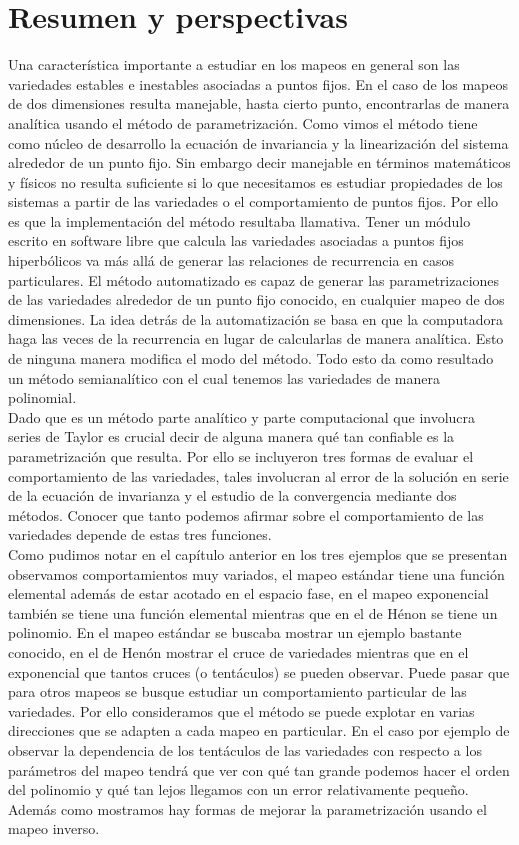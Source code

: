 
\chapter{Resumen y perspectivas}
Una característica importante a estudiar en los mapeos en general son las variedades estables e inestables asociadas a puntos fijos. En el caso de los mapeos de dos dimensiones resulta manejable, hasta cierto punto, encontrarlas de manera analítica usando el método de parametrización. Como vimos el método tiene como núcleo de desarrollo la ecuación de invariancia y la linearización del sistema alrededor de un punto fijo. Sin embargo decir manejable en términos matemáticos y físicos no resulta suficiente si lo que necesitamos es estudiar propiedades de los sistemas a partir de las variedades o el comportamiento de puntos fijos. Por ello es que la implementación del método resultaba llamativa. Tener un módulo escrito en software libre que calcula las variedades asociadas a puntos fijos hiperbólicos va más allá de generar las relaciones de recurrencia en casos particulares. El método automatizado es capaz de generar las parametrizaciones de las variedades alrededor de un punto fijo conocido, en cualquier mapeo de dos dimensiones. La idea detrás de la automatización se basa en que la computadora haga las veces de la recurrencia en lugar de calcularlas de manera analítica. Esto de ninguna manera modifica el modo del método. Todo esto da como resultado un método semianalítico con el cual tenemos las variedades de manera polinomial. \\

Dado que es un método parte analítico y parte computacional que involucra series de Taylor es crucial decir de alguna manera qué tan confiable es la parametrización que resulta. Por ello se incluyeron tres formas de evaluar el comportamiento de las variedades, tales involucran al error de la solución en serie de la ecuación de invarianza y el estudio de la convergencia mediante dos métodos. Conocer que tanto podemos afirmar sobre el comportamiento de las variedades depende de estas tres funciones.\\

Como pudimos notar en el capítulo anterior en los tres ejemplos que se presentan observamos comportamientos muy variados, el mapeo estándar tiene una función elemental además de estar acotado en el espacio fase, en el mapeo exponencial también se tiene una función elemental mientras que en el de Hénon se tiene un polinomio. En el mapeo estándar se buscaba mostrar un ejemplo bastante conocido, en el de Henón mostrar el cruce de variedades mientras que en el exponencial que tantos cruces (o tentáculos) se pueden observar. Puede pasar que para otros mapeos se busque estudiar un comportamiento particular de las variedades. Por ello consideramos que el método se puede explotar en varias direcciones que se adapten a cada mapeo en particular. En el caso por ejemplo de observar la dependencia de los tentáculos de las variedades con respecto a los parámetros del mapeo tendrá que ver con qué tan grande podemos hacer el orden del polinomio y qué tan lejos llegamos con un error relativamente pequeño. Además como mostramos hay formas de mejorar la parametrización usando el mapeo inverso. \\

